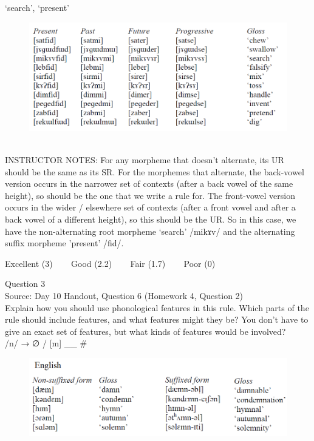 \documentclass[12pt]{article}
\begin{document}
`search', `present'

\begin{figure}[H]
\includegraphics{../images/final_dataset.png}
\end{figure}

~\\
INSTRUCTOR NOTES: For any morpheme that doesn’t alternate, its UR should be the same as its SR.  For the morphemes that alternate, the back-vowel version occurs in the narrower set of contexts (after a back vowel of the same height), so should be the one that we write a rule for. The front-vowel version occurs in the wider / elsewhere set of contexts (after a front vowel and after a back vowel of a different height), so this should be the UR. So in this case, we have the non-alternating root morpheme ‘search’ /mikɤv/ and the alternating suffix morpheme 'present' /fid/.


\vfill
Excellent (3) ~~~ Good (2.2) ~~~ Fair (1.7) ~~~ Poor (0)
\newpage

{\large Question 3}\\

Source: Day 10 Handout, Question 6 (Homework 4, Question 2)\\

Explain how you should use phonological features in this rule. Which parts of the rule should include features, and what features might they be? You don't have to give an exact set of features, but what kinds of features would be involved?\\

/n/ → ∅ / {[m]} \_\_ \#

\begin{figure}[H]
\includegraphics{../images/english_stemalternations.png}
\end{figure}
\end{document}
